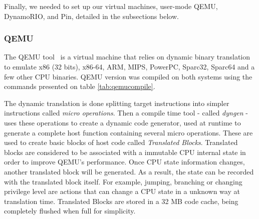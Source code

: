 \documentclass[11pt,twoside]{article}
\begin{document}
  Finally, we needed to set up our virtual machines, user-mode QEMU,
  DynamoRIO, and Pin, detailed in the subsections below.
\subsubsection{QEMU}
	\label{sec:qemu}

  The QEMU tool~\cite{qemubellard, qemubart} is a virtual machine
  that relies on dynamic binary translation to emulate x86 (32 bits),
  x86-64, ARM, MIPS, PowerPC, Sparc32, Sparc64 and a few other
  CPU binaries.
  QEMU version \qemuversion \space was compiled on both systems
  using the commands presented on table \ref{tab:qemucompile}. 

  The dynamic translation is done splitting target
  instructions into simpler instructions called
  \emph{micro operations}. Then a compile time tool
  - called \emph{dyngen} - uses these operations to create a
  dynamic code generator, used at runtime to generate a complete
  host function containing several micro operations.
  These are used to create basic blocks of host code
  called \emph{Translated Blocks}.
  Translated blocks are considered to be associated with a
  immutable CPU internal state in order to improve QEMU's
  performance. Once CPU state information changes, another
  translated block will be generated. As a result, the state
  can be recorded with the translated block itself.
  For example, jumping, branching or changing privilege level
  are actions that can change a CPU state in a unknown way
  at translation time.
  Translated Blocks are stored in a 32%
  MB code cache, being completely flushed when full for simplicity.
\end{document}
